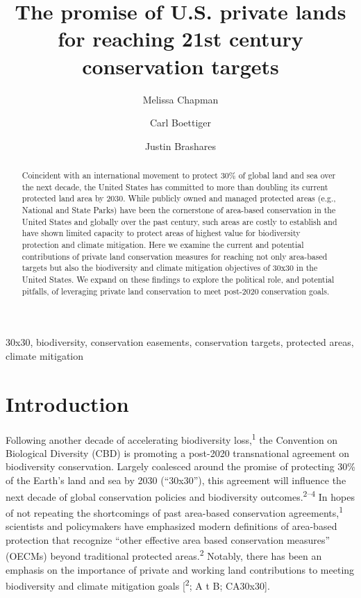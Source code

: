 \documentclass[3p]{elsarticle} %
\begin{document}
\begin{frontmatter}

  \title{The promise of U.S. private lands for reaching 21st century
conservation targets}
    \author[espm]{Melissa Chapman}
  
    \author[espm]{Carl Boettiger}
  
    \author[espm]{Justin Brashares}
  
      \address[espm]{Dept. of Environmental Science, Policy, and
Management, University of California Berkeley, Berkeley, CA, USA}
    
  \begin{abstract}
  Coincident with an international movement to protect 30\% of global
  land and sea over the next decade, the United States has committed to
  more than doubling its current protected land area by 2030. While
  publicly owned and managed protected areas (e.g., National and State
  Parks) have been the cornerstone of area-based conservation in the
  United States and globally over the past century, such areas are
  costly to establish and have shown limited capacity to protect areas
  of highest value for biodiversity protection and climate mitigation.
  Here we examine the current and potential contributions of private
  land conservation measures for reaching not only area-based targets
  but also the biodiversity and climate mitigation objectives of 30x30
  in the United States. We expand on these findings to explore the
  political role, and potential pitfalls, of leveraging private land
  conservation to meet post-2020 conservation goals.
  \end{abstract}
   \begin{keyword} 30x30, biodiversity, conservation
easements, conservation targets, protected areas, climate
mitigation\end{keyword}
 \end{frontmatter}

\hypertarget{introduction}{%
\section{Introduction}\label{introduction}}

Following another decade of accelerating biodiversity
loss,\textsuperscript{1} the Convention on Biological Diversity (CBD) is
promoting a post-2020 transnational agreement on biodiversity
conservation. Largely coalesced around the promise of protecting 30\% of
the Earth's land and sea by 2030 (``30x30''), this agreement will
influence the next decade of global conservation policies and
biodiversity outcomes.\textsuperscript{2--4} In hopes of not repeating
the shortcomings of past area-based conservation
agreements,\textsuperscript{1} scientists and policymakers have
emphasized modern definitions of area-based protection that recognize
``other effective area based conservation measures'' (OECMs) beyond
traditional protected areas.\textsuperscript{2} Notably, there has been
an emphasis on the importance of private and working land contributions
to meeting biodiversity and climate mitigation goals
{[}\textsuperscript{2}; A t B; CA30x30{]}.
\end{document}
